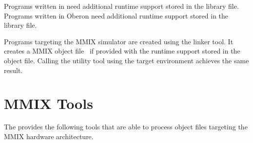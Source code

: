 Programs written in \cpp{} need additional runtime support stored in the  library file.
Programs written in Oberon need additional runtime support stored in the  library file.
\seecpp\seeoberon

Programs targeting the MMIX simulator are created using the  linker tool.
It creates a MMIX object file~\cite{mmixware} if provided with the runtime support stored in the  object file.
Calling the  utility tool using the  target environment achieves the same result.

\section{MMIX Tools}

The \ecs{} provides the following tools that are able to process object files targeting the MMIX hardware architecture.
\interface

\cdmmix
\cppmmix
\falmmix
\obmmix
\mmixasm
\mmixdism
\linkbin

\concludechapter
